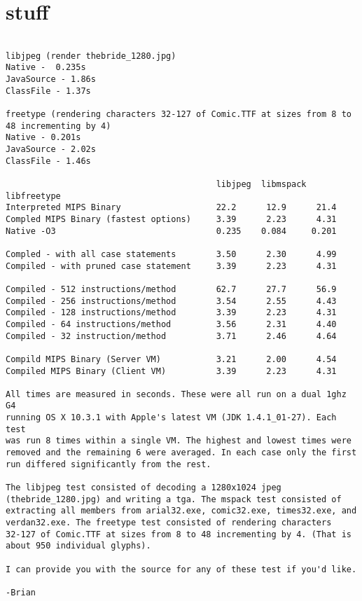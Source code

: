 \documentclass{acmconf}
\begin{document}
\section{stuff}
\begin{onecolumn}
{\footnotesize\begin{verbatim}

libjpeg (render thebride_1280.jpg)
Native -  0.235s
JavaSource - 1.86s
ClassFile - 1.37s

freetype (rendering characters 32-127 of Comic.TTF at sizes from 8 to
48 incrementing by 4)
Native - 0.201s
JavaSource - 2.02s
ClassFile - 1.46s

                                          libjpeg  libmspack libfreetype
Interpreted MIPS Binary                   22.2      12.9      21.4
Compled MIPS Binary (fastest options)     3.39      2.23      4.31
Native -O3                                0.235    0.084     0.201

Compled - with all case statements        3.50      2.30      4.99
Compiled - with pruned case statement     3.39      2.23      4.31

Compiled - 512 instructions/method        62.7      27.7      56.9
Compiled - 256 instructions/method        3.54      2.55      4.43
Compiled - 128 instructions/method        3.39      2.23      4.31
Compiled - 64 instructions/method         3.56      2.31      4.40
Compiled - 32 instruction/method          3.71      2.46      4.64

Compild MIPS Binary (Server VM)           3.21      2.00      4.54
Compiled MIPS Binary (Client VM)          3.39      2.23      4.31

All times are measured in seconds. These were all run on a dual 1ghz G4
running OS X 10.3.1 with Apple's latest VM (JDK 1.4.1_01-27). Each test
was run 8 times within a single VM. The highest and lowest times were
removed and the remaining 6 were averaged. In each case only the first
run differed significantly from the rest.

The libjpeg test consisted of decoding a 1280x1024 jpeg
(thebride_1280.jpg) and writing a tga. The mspack test consisted of
extracting all members from arial32.exe, comic32.exe, times32.exe, and
verdan32.exe. The freetype test consisted of rendering characters
32-127 of Comic.TTF at sizes from 8 to 48 incrementing by 4. (That is
about 950 individual glyphs).

I can provide you with the source for any of these test if you'd like.

-Brian
\end{verbatim}}
\end{onecolumn}
\end{document}
